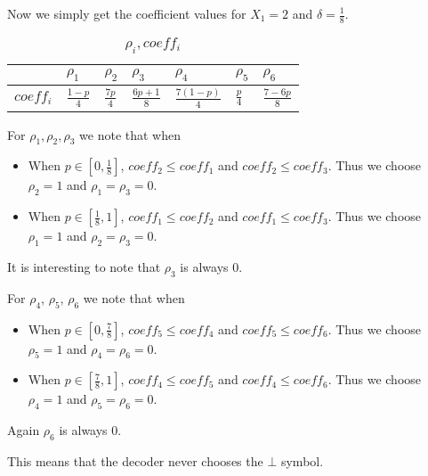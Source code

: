 \documentclass{article}
\begin{document}
Now we simply get the coefficient values for $X_1 = 2$ and $\delta = \frac{1}{8}$.
\begin{table}[H]
\centering
\caption{$\rho_i, coeff_i$}
\label{t:1}
\begin{tabular}{|l|l|l|l|l|l|l|}
\hline
          & $\rho_1$        & $\rho_2$       & $\rho_3$           & $\rho_4$           & $\rho_5$      & $\rho_6$           \\ \hline
$coeff_i$ & $\frac{1-p}{4}$ & $\frac{7p}{4}$ & $\frac{6p + 1}{8}$ & $\frac{7(1-p)}{4}$ & $\frac{p}{4}$ & $\frac{7 - 6p}{8}$ \\ \hline
\end{tabular}
\end{table}
For $\rho_1, \rho_2, \rho_3$ we note that when
\begin{itemize}
\item When $p \in [0,\frac{1}{8}]$, $coeff_2 \le coeff_1$ and $coeff_2 \le coeff_3$. Thus we choose $\rho_2=1$ and $\rho_1 = \rho_3 = 0$.
\item When $p \in [\frac{1}{8}, 1]$, $coeff_1 \le coeff_2$ and $coeff_1 \le coeff_3$. Thus we choose $\rho_1 = 1$ and $\rho_2 = \rho_3 = 0$.
\end{itemize}
It is interesting to note that $\rho_3$ is always 0.

For $\rho_4$, $\rho_5$, $\rho_6$ we note that when
\begin{itemize}
\item When $p \in [0, \frac{7}{8}]$, $coeff_5 \le coeff_4$ and $coeff_5 \le coeff_6$. Thus we choose $\rho_5 = 1$ and $\rho_4 = \rho_6 = 0$.
\item When $p \in [\frac{7}{8}, 1]$, $coeff_4 \le coeff_5$ and $coeff_4 \le coeff_6$. Thus we choose $\rho_4 = 1$ and $\rho_5 = \rho_6 = 0$.
\end{itemize}
Again $\rho_6$ is always 0.

This means that the decoder never chooses the $\bot$ symbol.
\end{document}
